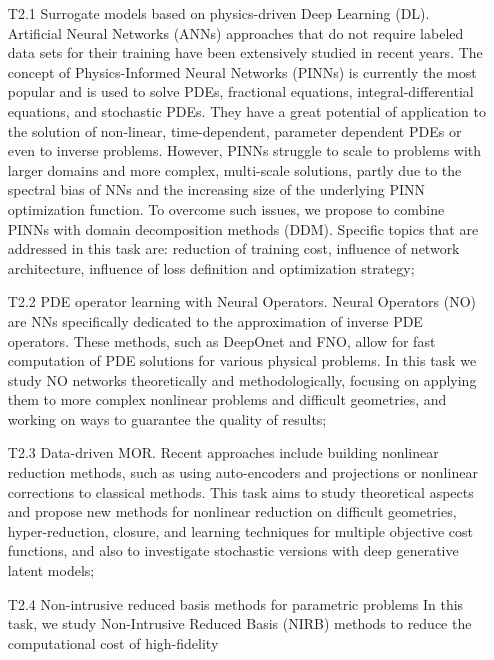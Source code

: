 \begin{itemize}
\item[T2.1]  Surrogate models  based on  physics-driven Deep  Learning
  (DL).   Artificial Neural  Networks  (ANNs) approaches  that do  not
  require labeled data  sets for their training  have been extensively
  studied  in recent  years.  The  concept of  Physics-Informed Neural
  Networks (PINNs) is currently the most  popular and is used to solve
  PDEs,  fractional  equations, integral-differential  equations,  and
  stochastic PDEs. They  have a great potential of  application to the
  solution of non-linear, time-dependent,  parameter dependent PDEs or
  even  to inverse  problems.   However, PINNs  struggle  to scale  to
  problems  with   larger  domains   and  more   complex,  multi-scale
  solutions, partly due to the spectral bias of NNs and the increasing
  size of the underlying PINN optimization function. To overcome such
  issues, we propose to combine PINNs with domain decomposition methods
  (DDM).   Specific  topics  that  are addressed  in  this  task  are:
  reduction  of  training  cost, influence  of  network  architecture,
  influence of loss definition and optimization strategy; 
\item[T2.2]  PDE  operator  learning with  Neural  Operators.   Neural
  Operators (NO)  are NNs specifically dedicated  to the approximation
  of inverse PDE operators.  These  methods, such as DeepOnet and FNO,
  allow for  fast computation  of PDE  solutions for  various physical
  problems.  In  this task  we  study  NO networks  theoretically  and
  methodologically,  focusing   on  applying  them  to   more  complex
  nonlinear problems and difficult geometries,  and working on ways to
  guarantee the quality of results;
\item  [T2.3]  Data-driven  MOR. Recent  approaches  include  building
  nonlinear  reduction  methods,  such   as  using  auto-encoders  and
  projections or nonlinear corrections to classical methods. This task
  aims  to  study theoretical  aspects  and  propose new  methods  for
  nonlinear  reduction   on  difficult   geometries,  hyper-reduction,
  closure,  and  learning  techniques   for  multiple  objective  cost
  functions,  and also  to investigate  stochastic versions  with deep
  generative latent models;  
\item[T2.4]  Non-intrusive   reduced  basis  methods   for  parametric
  problems In this  task, we study Non-Intrusive  Reduced Basis (NIRB)
  methods   to  reduce   the  computational   cost  of   high-fidelity

\end{itemize}
